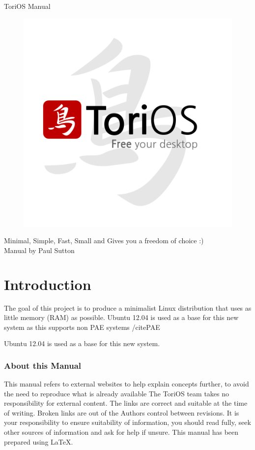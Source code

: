 \documentclass[12pt,a4paper]{book}
\author{Paul Sutton}
\begin{document}
\begin{center}
{\Huge ToriOS Manual}
\end{center}



\begin{figure}
\centering
\includegraphics[width=0.7\linewidth]{screen-shots/FinalLogo}

\end{figure}


\begin{center}
Minimal, Simple, Fast, Small and Gives you a freedom of choice :) \\
Manual by Paul Sutton
\end{center}

\tableofcontents
{}
\chapter{Introduction}
The goal of this project is to produce a minimalist Linux distribution that uses as little memory (RAM) as possible. Ubuntu 12.04 is used as a base for this new system as this supports non PAE systems /cite{PAE}


Ubuntu 12.04 is used as a base for this new system.
\subsection{About this Manual}
This manual refers to external websites to help explain concepts further, to avoid the need to reproduce what is already available  The ToriOS team takes no responsibility for external content.  The links are correct and suitable at the time of writing.  Broken links are out of the Authors control between revisions.  It is your responsibility to ensure suitability of information, you should read fully, seek other sources of information and ask for help if unsure.  
This manual has been prepared using \LaTeX.
\end{document}
